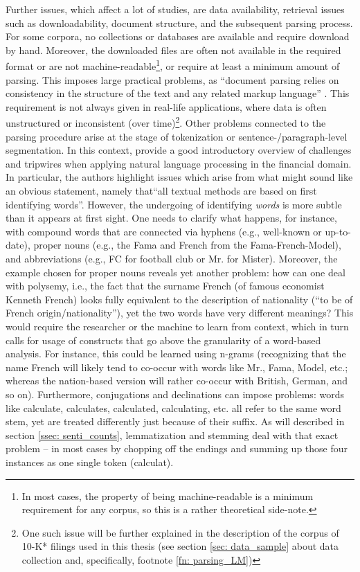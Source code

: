 Further issues, which affect a lot of studies, are data availability, retrieval issues such as downloadability, document structure, and the subsequent parsing process. For some corpora, no collections or databases are available and require download by hand. Moreover, the downloaded files are often not available in the required format or are not machine-readable\footnote{In most cases, the property of being machine-readable is a minimum requirement for any corpus, so this is a rather theoretical side-note.}, or require at least a minimum amount of parsing. This imposes large practical problems, as \enquote{document parsing relies on consistency in the structure of the text and any related markup language} \parencite[1192]{LM-meta-2016}. This requirement is not always given in real-life applications, where data is often unstructured or inconsistent (over time)\footnote{One such issue will be further explained in the description of the corpus of 10-K* filings used in this thesis (see section \ref{sec: data_sample} about data collection and, specifically, footnote \ref{fn: parsing_LM})}. Other problems connected to the parsing procedure arise at the stage of tokenization or sentence-/paragraph-level segmentation. In this context, \textcite[1215]{LM-meta-2016} provide a good introductory overview of challenges and tripwires when applying natural language processing in the financial domain. In particular, the authors highlight issues which arise from what might sound like an obvious statement, namely that\enquote{all textual methods are based on first identifying words}. However, the undergoing of identifying \textit{words} is more subtle than it appears at first sight. One needs to clarify what happens, for instance, with compound words that are connected via hyphens (e.g., \textsf{well-known} or \textsf{up-to-date}), proper nouns (e.g., the \textsf{Fama} and \textsf{French} from the Fama-French-Model), and abbreviations (e.g., \textsf{FC} for football club or \textsf{Mr.} for Mister). Moreover, the example chosen for proper nouns reveals yet another problem: how can one deal with polysemy, i.e., the fact that the surname \textsf{French} (of famous economist Kenneth French) looks fully equivalent to the description of nationality (\enquote{to be of \textsf{French} origin/nationality}), yet the two words have very different meanings? This would require the researcher or the machine to learn from context, which in turn calls for usage of constructs that go above the granularity of a word-based analysis. For instance, this could be learned using n-grams (recognizing that the name \textsf{French} will likely tend to co-occur with words like \textsf{Mr.}, \textsf{Fama}, \textsf{Model}, etc.; whereas the nation-based version will rather co-occur with \textsf{British}, \textsf{German}, and so on). Furthermore, conjugations and declinations can impose problems: words like \textsf{calculate, calculates, calculated, calculating}, etc. all refer to the same word stem, yet are treated differently just because of their suffix. As will described in section \ref{ssec: senti_counts}, lemmatization and stemming deal with that exact problem -- in most cases by chopping off the endings and summing up those four instances as one single token (\textsf{calculat}). 

